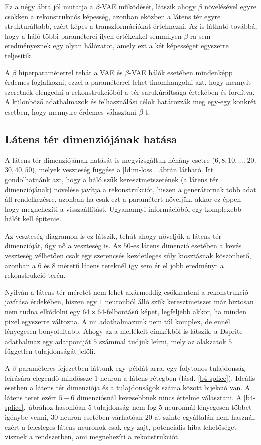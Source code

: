 Ez a négy ábra jól mutatja a $\beta$-VAE működését, látszik ahogy $\beta$ növelésével egyre csökken a rekonstrukciós képesség, azonban eközben a látens tér egyre strukturáltabb, ezért képes a transzformációkat értelmezni. Az is látható továbbá, hogy a háló többi paraméterei ilyen értékekkel semmilyen $\beta$-ra sem eredményeznek egy olyan hálózatot, amely ezt a két képességet egyszerre teljesítik.



A $\beta$ hiperparaméterrel tehát a VAE és $\beta$-VAE hálók esetében mindenképp érdemes foglalkozni, ezzel a paraméterrel lehet finomhangolni azt, hogy mennyit szeretnék elengedni a rekonstrukcióból a tér sarukúráltsága értekében és fordítva. A különböző adathalmazok és felhasználási célok határozzák meg egy-egy konkrét esetben, hogy mennyire érdemes választani $\beta$-t.

\subsection{Látens tér dimenziójának hatása}

A látens tér dimenziójának hatását is megvizsgáltuk néhány esetre ($6, 8, 10, \dots , 20,$ $30, 40, 50$), melyek veszteség függése a \ref{ldim-loss}.~ábrán látható. Itt gondolhatnánk azt, hogy a háló szűk keresztmetszetének (a látens tér dimenziójának) növelése javítja a rekonstrukciót, hiszen a generátornak több adat áll rendelkezésre, azonban ha csak ezt a paramétert növeljük, akkor ez éppen hogy megnehezíti a visszaállítást. Ugyanannyi információból egy komplexebb hálót kell építenie.

Az veszteség diagramon is ez látszik, tehát ahogy növeljük a látens tér dimenzióját, úgy nő a veszteség is. Az $50$-es látens dimenzió esetében a kevés veszteség vélhetően csak egy szerencsés kezdetleges súly kiosztásnak köszönhető, azonban a $6$ és $8$ méretű látens tereknél így sem ér el jobb eredményt a rekonstrukció terén. 

Nyilván a látens tér méretét nem lehet akármeddig csökkenteni a rekonstrukció javítása érdekében, hiszen egy $1$ neuronból álló szűk keresztmetszet már biztosan nem tudna elkódolni egy $64\times64$-felbontású képet, legfeljebb akkor, ha minden pixel egyszerre változna. A mi adathalmazunk nem túl komplex, de ennél lényegesen bonyolultabb. Ahogy az a mellékelt címkékből is látszik, a Dsprite adathalmaz egy adatpontját $5$ számmal tudjuk leírni, mely az alakzatok $5$ független tulajdonságát jelöli.

A $\beta$ paraméteres fejezetben láttunk egy példát arra, egy folytonos tulajdonság leírására elegendő mindössze $1$ neuron a látens rétegben (lásd. \ref{b4-splice}). Ideális esetben a látens tér dimenziója és a tulajdonságok száma között bijekció van. A látens teret ezért $5-6$ dimenziósnál kevesebbnek nincs értelme választani. A \ref{b4-splice}.~ábrához hasonlóan $5$ tulajdonság nem fog $5$ neuronnál lényegesen többet igénybe venni, $30$ neuron esetében várhatóan $20$-at szinte egyáltalán nem használ, ezért a felesleges látens neuronok csak egy zajt, potenciális hiba lehetőséget visznek a rendszerben, ami megnehezíti a rekonstrukciót.

